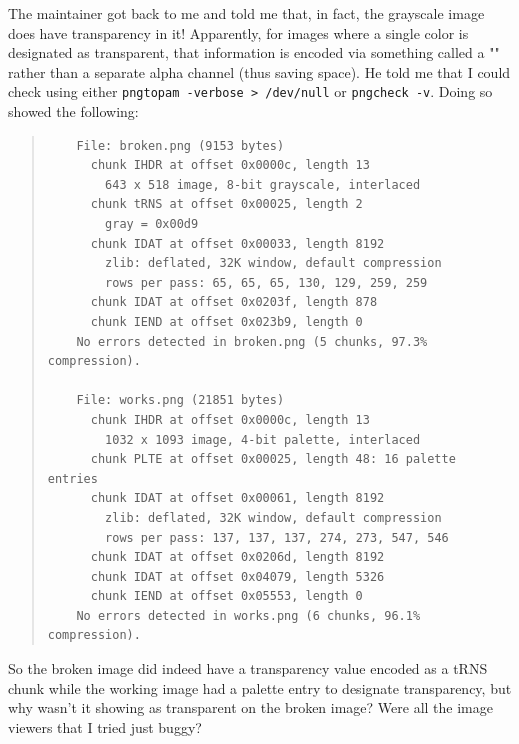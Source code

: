 \documentclass{article}
\begin{document}
The maintainer got back to me and told me that, in fact, the grayscale image does have transparency in it!  Apparently, for images where a single color is designated as transparent, that information is encoded via something called a "" rather than a separate alpha channel (thus saving space).  He told me that I could check using either \texttt{pngtopam -verbose > /dev/null} or \texttt{pngcheck -v}.  Doing so showed the following:
\begin{quote}
\begin{verbatim}
	File: broken.png (9153 bytes)
	  chunk IHDR at offset 0x0000c, length 13
	    643 x 518 image, 8-bit grayscale, interlaced
	  chunk tRNS at offset 0x00025, length 2
	    gray = 0x00d9
	  chunk IDAT at offset 0x00033, length 8192
	    zlib: deflated, 32K window, default compression
	    rows per pass: 65, 65, 65, 130, 129, 259, 259
	  chunk IDAT at offset 0x0203f, length 878
	  chunk IEND at offset 0x023b9, length 0
	No errors detected in broken.png (5 chunks, 97.3% compression).

	File: works.png (21851 bytes)
	  chunk IHDR at offset 0x0000c, length 13
	    1032 x 1093 image, 4-bit palette, interlaced
	  chunk PLTE at offset 0x00025, length 48: 16 palette entries
	  chunk IDAT at offset 0x00061, length 8192
	    zlib: deflated, 32K window, default compression
	    rows per pass: 137, 137, 137, 274, 273, 547, 546
	  chunk IDAT at offset 0x0206d, length 8192
	  chunk IDAT at offset 0x04079, length 5326
	  chunk IEND at offset 0x05553, length 0
	No errors detected in works.png (6 chunks, 96.1% compression).
\end{verbatim}
\end{quote}
So the broken image did indeed have a transparency value encoded as a tRNS chunk while the working image had a palette entry to designate transparency, but why wasn't it showing as transparent on the broken image?  Were all the image viewers that I tried just buggy?
\end{document}

